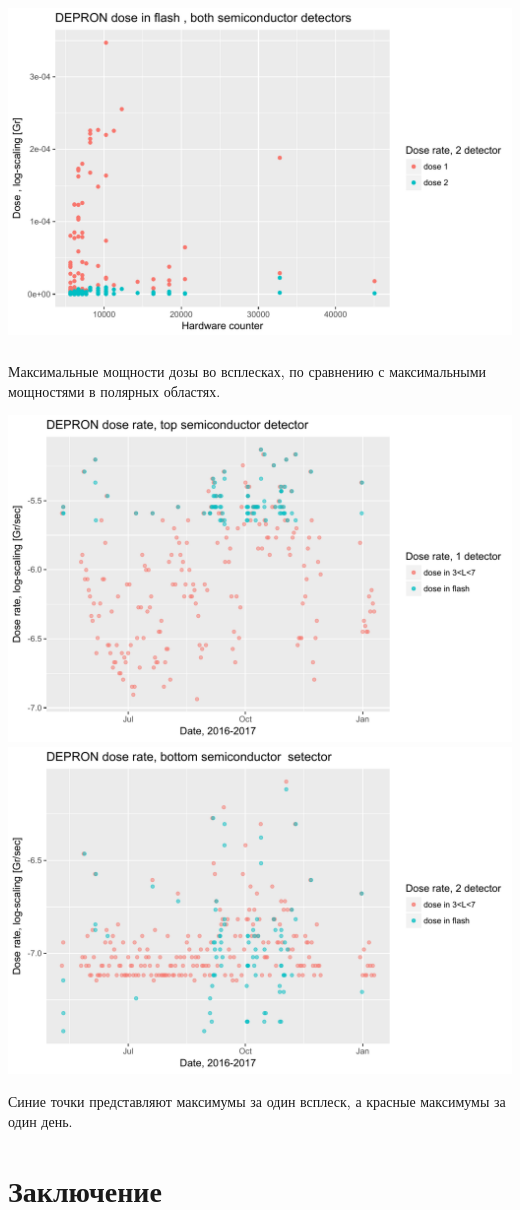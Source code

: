 \documentclass[t, aspectratio=43]{beamer}
\begin{document}
\begin{frame}	
\frametitle{\insertsection} 
\begin{center}
	
	\includegraphics[width=.9\linewidth]{dosevscounth}
\end{center}


\end{frame}

\begin{frame}	
\frametitle{\insertsection} 
Максимальные мощности дозы во всплесках, по сравнению с максимальными мощностями в полярных областях. 

\begin{center}
	\includegraphics[width=0.5\linewidth]{images/dose1flashvsdaymax}
	\includegraphics[width=0.5\linewidth]{images/dose2flashvsdaymax}
\end{center}

Синие точки представляют максимумы за один всплеск, а красные максимумы за один день.

\end{frame}
\section{Заключение}

\begin{frame}	
\frametitle{\insertsection} 


\end{frame}
\end{document}
